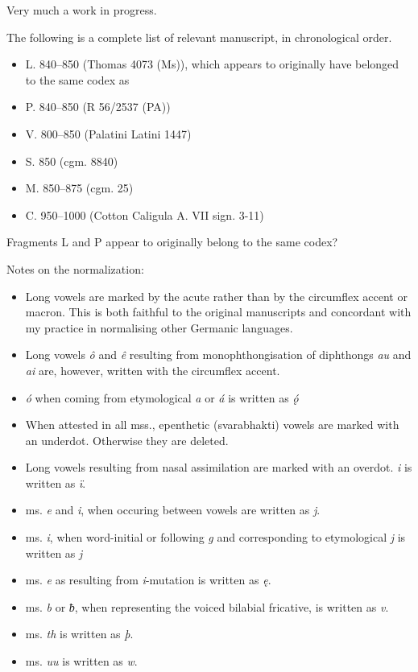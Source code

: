 
Very much a work in progress.

The following is a complete list of relevant manuscript, in chronological order.

\begin{itemize}
  \item L. 840–850 (Thomas 4073 (Ms)), which appears to originally have belonged to the same codex as
  \item P. 840–850 (R 56/2537 (PA))
  \item V. 800–850 (Palatini Latini 1447)
  \item S. 850 (cgm. 8840)
  \item M. 850–875 (cgm. 25)
  \item C. 950–1000 (Cotton Caligula A. VII sign. 3-11)
\end{itemize}

Fragments L and P appear to originally belong to the same codex?


Notes on the normalization:
  \begin{itemize}
    \item Long vowels are marked by the acute rather than by the circumflex accent or macron. This is both faithful to the original manuscripts and concordant with my practice in normalising other Germanic languages.
    \item Long vowels \emph{ô} and \emph{ê} resulting from monophthongisation of diphthongs \emph{au} and \emph{ai} are, however, written with the circumflex accent.
    \item \emph{ó} when coming from etymological \emph{a} or \emph{á} is written as \emph{ǫ́}
    \item When attested in all mss., epenthetic (svarabhakti) vowels are marked with an underdot. Otherwise they are deleted.
    \item Long vowels resulting from nasal assimilation are marked with an overdot. \emph{i} is written as \emph{ï}.
    \item ms. \emph{e} and \emph{i}, when occuring between vowels are written as \emph{j}.
    \item ms. \emph{i}, when word-initial or following \emph{g} and corresponding to etymological \emph{j} is written as \emph{j}
    \item ms. \emph{e} as resulting from \emph{i}-mutation is written as \emph{ę}.
    \item ms. \emph{b} or \emph{ƀ}, when representing the voiced bilabial fricative, is written as \emph{v}.
    \item ms. \emph{th} is written as \emph{þ}.
    \item ms. \emph{uu} is written as \emph{w}.
  \end{itemize}

